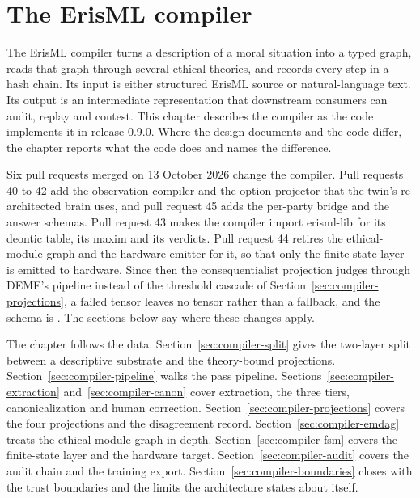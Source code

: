 
\chapter{The ErisML compiler}\label{ch:compiler}

The ErisML compiler turns a description of a moral situation into a typed graph, reads that graph
through several ethical theories, and records every step in a hash chain. Its input is either
structured ErisML source or natural-language text. Its output is an intermediate representation
that downstream consumers can audit, replay and contest. This chapter describes the compiler as
the code implements it in release 0.9.0. Where the design documents and the code differ, the
chapter reports what the code does and names the difference.

Six pull requests merged on 13 October 2026 change the compiler. Pull requests 40 to 42 add the
observation compiler and the option projector that the twin's re-architected brain uses, and
pull request 45 adds the per-party bridge and the answer schemas. Pull request 43 makes the
compiler import erisml-lib for its deontic table, its maxim and its verdicts. Pull request 44
retires the ethical-module graph and the hardware emitter for it, so that only the finite-state
layer is emitted to hardware. Since then the consequentialist projection judges through DEME's
pipeline instead of the threshold cascade of Section~\ref{sec:compiler-projections}, a failed
tensor leaves no tensor rather than a fallback, and the schema is
. The sections below say where these changes apply.

The chapter follows the data. Section~\ref{sec:compiler-split} gives the two-layer split between a
descriptive substrate and the theory-bound projections. Section~\ref{sec:compiler-pipeline} walks
the pass pipeline. Sections~\ref{sec:compiler-extraction} and~\ref{sec:compiler-canon} cover
extraction, the three tiers, canonicalization and human correction.
Section~\ref{sec:compiler-projections} covers the four projections and the disagreement record.
Section~\ref{sec:compiler-emdag} treats the ethical-module graph in depth.
Section~\ref{sec:compiler-fsm} covers the finite-state layer and the hardware target.
Section~\ref{sec:compiler-audit} covers the audit chain and the training export.
Section~\ref{sec:compiler-boundaries} closes with the trust boundaries and the limits the
architecture states about itself.

